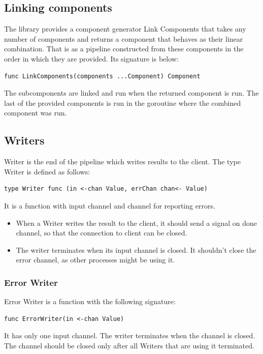 \documentclass[12pt,a4paper]{article}
\begin{document}
\subsection{Linking components}
The library provides a component generator Link Components that takes 
any number of components and returns a component that behaves as their 
linear combination. That is as a pipeline constructed from these components 
in the order in which they are provided. Its signature is below:
\begin{lstlisting}
func LinkComponents(components ...Component) Component
\end{lstlisting}
The subcomponents are linked and run when the returned component is run. 
The last of the provided components is run in the goroutine where
the combined component was run.

\subsection{Writers}
Writer is the end of the pipeline which writes results to the client.
The type Writer is defined as follows:

\begin{lstlisting}
type Writer func (in <-chan Value, errChan chan<- Value)
\end{lstlisting}

It is a function with input channel and channel for reporting errors.
\begin{itemize}
	\item When a Writer writes the result to the client, it should send a signal
				on done channel, so that the connection to client can be closed.
	\item The writer terminates when its input channel is closed. It shouldn't
			  close the error channel, as other processes might be using it.
\end{itemize}

\subsubsection{Error Writer}
Error Writer is a function with the following signature:

\begin{lstlisting}
func ErrorWriter(in <-chan Value)
\end{lstlisting}
It has only one input channel. The writer terminates when the channel
is closed. The channel should be closed only after all Writers that 
are using it terminated.
\end{document}
